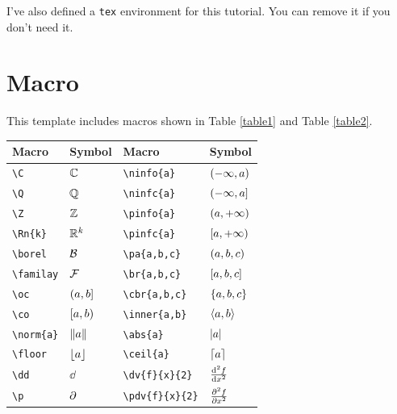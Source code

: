 \documentclass[11pt,a4paper]{article}
\begin{document}
{\color{blue}I've also defined a \verb|tex| environment for this tutorial. You can remove it if you don't need it.}


\section{Macro}
{\color{blue}This template includes macros shown in Table \ref{table1} and Table \ref{table2}.}

\begin{table}[h]
\centering
\setlength{\arrayrulewidth}{1pt} %
\setlength{\tabcolsep}{10pt}     %
\renewcommand{\arraystretch}{1.5} %
\begin{tabular}{|>{\centering\arraybackslash}m{3cm}|>{\centering\arraybackslash}m{3cm}||>{\centering\arraybackslash}m{3cm}|>{\centering\arraybackslash}m{3cm}|}
\hline
\textbf{Macro} & \textbf{Symbol} & \textbf{Macro} & \textbf{Symbol} \\
\hline
\texttt{\textbackslash C}  & $ \mathbb{C} $   & \texttt{\textbackslash ninfo\{a\}}    & $(-\infty,a)$ \\
\texttt{\textbackslash Q}  & $ \mathbb{Q} $   & \texttt{\textbackslash ninfc\{a\}}    & $(-\infty,a]$ \\
\texttt{\textbackslash Z}  & $ \mathbb{Z} $   & \texttt{\textbackslash pinfo\{a\}}    & $(a,+\infty)$ \\
\texttt{\textbackslash Rn\{k\}}  & $ \mathbb{R}^{k} $   & \texttt{\textbackslash  pinfc\{a\}}    & $[a,+\infty)$ \\
\texttt{\textbackslash borel}  & $ \mathcal{B} $   & \texttt{\textbackslash pa\{a,b,c\}}    & $\lparen a,b,c\rparen$ \\
\texttt{\textbackslash familay}  & $ \mathcal{F} $   & \texttt{\textbackslash br\{a,b,c\}}    & $[a,b,c]$ \\
\texttt{\textbackslash oc}  & $ \lparen a,b] $   & \texttt{\textbackslash cbr\{a,b,c\}}    & $\{a,b,c\}$ \\
\texttt{\textbackslash co}  & $ [a,b\rparen $   & \texttt{\textbackslash inner\{a,b\}}  & $ \langle a,b\rangle $  \\
 \texttt{\textbackslash norm\{a\}}    & $\Vert a\Vert$ & \texttt{\textbackslash abs\{a\}}    & $\lvert a\rvert$ \\
\texttt{\textbackslash floor}  & $ \lfloor a\rfloor $   & \texttt{\textbackslash ceil\{a\}}    & $\lceil a\rceil$ \\



\texttt{\textbackslash dd}  & $ \dd $   & \texttt{\textbackslash dv\{f\}\{x\}\{2\}}    & $\frac{\textnormal{d}^{2} {f}}{\textnormal{d} {x}^{2}}$ \\
\texttt{\textbackslash p}  & $ \partial $   & \texttt{\textbackslash pdv\{f\}\{x\}\{2\}}    & $\frac{\partial^{2} {f}}{\partial {x}^{2}}$ \\
  

\end{tabular}
\end{table}
\end{document}
